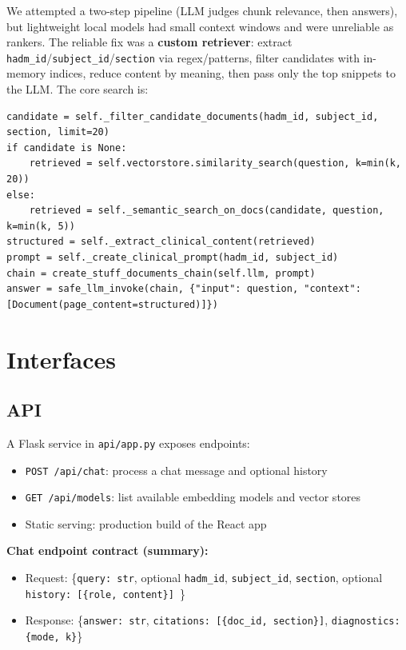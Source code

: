 We attempted a two-step pipeline (LLM judges chunk relevance, then answers), but lightweight local models had small context windows and were unreliable as rankers. The reliable fix was a \textbf{custom retriever}: extract \texttt{hadm\_id}/\break\texttt{subject\_id}/\texttt{section} via regex/patterns, filter candidates with in-memory indices, reduce content by meaning, then pass only the top snippets to the LLM. The core search is:
\begin{verbatim}
candidate = self._filter_candidate_documents(hadm_id, subject_id, section, limit=20)
if candidate is None:
    retrieved = self.vectorstore.similarity_search(question, k=min(k, 20))
else:
    retrieved = self._semantic_search_on_docs(candidate, question, k=min(k, 5))
structured = self._extract_clinical_content(retrieved)
prompt = self._create_clinical_prompt(hadm_id, subject_id)
chain = create_stuff_documents_chain(self.llm, prompt)
answer = safe_llm_invoke(chain, {"input": question, "context": [Document(page_content=structured)]})
\end{verbatim}


\section{Interfaces}

\subsection{API}
A Flask service in \texttt{api/app.py} exposes endpoints:
\begin{itemize}
  \item \texttt{POST /api/chat}: process a chat message and optional history
  \item \texttt{GET /api/models}: list available embedding models and vector stores
  \item Static serving: production build of the React app
\end{itemize}

\noindent \textbf{Chat endpoint contract (summary):}
\begin{itemize}
  \item Request: \{\texttt{query: str}, optional \texttt{hadm\_id}, \texttt{subject\_id}, \break\texttt{section}, optional \texttt{history: [\{role, content\}] }\}
  \item Response: \{\texttt{answer: str}, \texttt{citations: [\{doc\_id, section\}]}, \break\texttt{diagnostics: \{mode, k\}}\}
\end{itemize}

